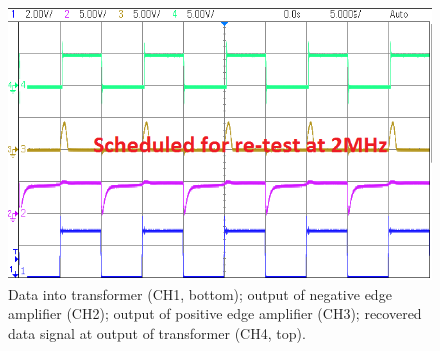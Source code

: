 \documentclass[conference]{IEEEtran}
\begin{document}
	\begin{figure}[t]
		\centering
		\includegraphics[width=0.8\columnwidth]{./img/DataCroppedREQUPD}
		\caption{Data into transformer (CH1, bottom); output of negative edge amplifier (CH2); output of positive edge amplifier (CH3); recovered data signal at output of transformer (CH4, top).}
		\label{fig:Data}
	\end{figure}

\end{document}
